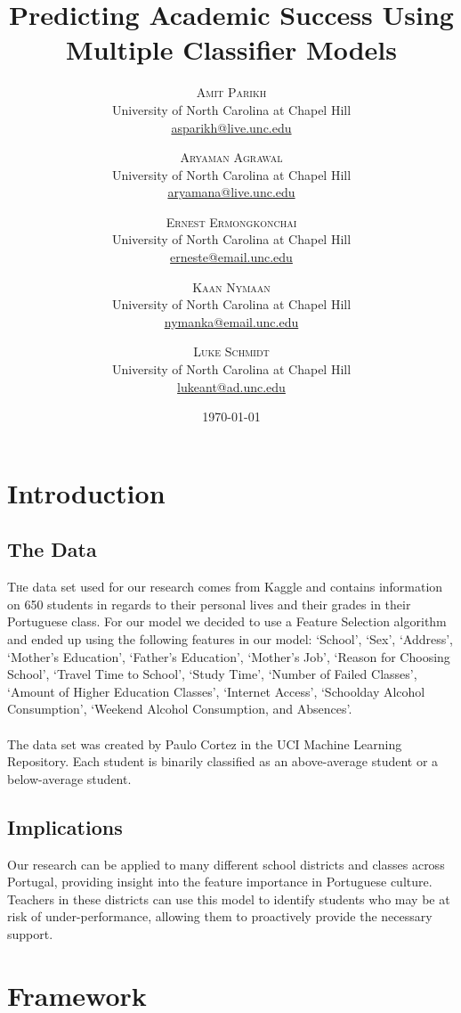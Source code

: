 \documentclass[twoside,twocolumn]{article}
\title{Predicting Academic Success Using Multiple Classifier Models} %
\author{%
\textsc{Amit Parikh} \\[1ex] %
\normalsize University of North Carolina at Chapel Hill \\ %
\normalsize \href{mailto:john@smith.com}{asparikh@live.unc.edu} %
\and %
\textsc{Aryaman Agrawal} \\[1ex] %
\normalsize University of North Carolina at Chapel Hill \\ %
\normalsize \href{mailto:john@smith.com}{aryamana@live.unc.edu} %
\and %
\textsc{Ernest Ermongkonchai} \\[1ex] %
\normalsize University of North Carolina at Chapel Hill \\ %
\normalsize \href{mailto:jane@smith.com}{erneste@email.unc.edu} %
\and %
\textsc{Kaan Nymaan} \\[1ex] %
\normalsize University of North Carolina at Chapel Hill \\ %
\normalsize \href{mailto:jane@smith.com}{nymanka@email.unc.edu} %
\and %
\textsc{Luke Schmidt} \\[1ex] %
\normalsize University of North Carolina at Chapel Hill \\ %
\normalsize \href{mailto:jane@smith.com}{lukeant@ad.unc.edu} %
}
\date{\today} %
\begin{document}
\maketitle


\section{Introduction}
\subsection{The Data}
\lettrine[nindent=0em,lines=3] {T}he data set used for our research comes from Kaggle and contains information on 650 students in regards to their personal lives and their grades in their Portuguese class. For our model we decided to use a Feature Selection algorithm and ended up using the following features in our model: ‘School’, ‘Sex’, ‘Address’, ‘Mother’s Education’, ‘Father’s Education’, ‘Mother’s Job’, ‘Reason for Choosing School’, ‘Travel Time to School’, ‘Study Time’, ‘Number of Failed Classes’, ‘Amount of Higher Education Classes’, ‘Internet Access’, ‘Schoolday Alcohol Consumption’, ‘Weekend Alcohol Consumption, and Absences’.
\\ \\
The data set was created by Paulo Cortez in the UCI Machine Learning Repository. Each student is binarily classified as an above-average student or a below-average student.
\subsection{Implications}
Our research can be applied to many different school districts and classes across Portugal, providing insight into the feature importance in Portuguese culture. Teachers in these districts can use this model to identify students who may be at risk of under-performance, allowing them to proactively provide the necessary support.


\section{Framework}
\end{document}
